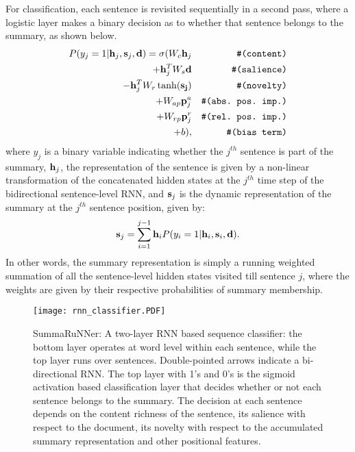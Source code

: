 \documentclass[letterpaper]{article}
\begin{document}
For classification, each sentence is revisited sequentially in a second pass, where a logistic layer makes a binary decision as to whether that sentence belongs to the summary, as shown below.
\begin{eqnarray}\label{eq:classification}
P(y_j=1|{\bf h}_j, {\bf s}_j, {\bf d}) = \sigma(W_{c}{\bf h}_j && \verb|#(content)| \nonumber\\
                                      + {\bf h}_j^TW_{s}{\bf d} && \verb|#(salience)| \nonumber\\
 - {\bf h}_j^TW_{r}\tanh({\bf s_j}) && \verb|#(novelty)| \nonumber\\ 
 + W_{ap}{\bf p}^a_j && \verb|#(abs. pos. imp.)| \nonumber\\
 + W_{rp}{\bf p}^r_j  && \verb|#(rel. pos. imp.)| \nonumber\\
 + b),&& \verb|#(bias term)| 
\end{eqnarray}
where $y_j$ is a binary variable indicating whether the $j^{th}$ sentence is part of the summary, ${\bf h}_j$, the representation of the sentence is given by a non-linear transformation of the concatenated hidden states at the $j^{th}$ time step of the bidirectional sentence-level RNN, and ${\bf s}_j$ is the dynamic representation of the summary at the $j^{th}$ sentence position, given by:
\begin{equation}\label{eq:summary_rep}
{\bf s}_j = \sum_{i=1}^{j-1}{\bf h}_iP(y_i=1|{\bf h}_i, {\bf s}_i, {\bf d}).
\end{equation}
In other words, the summary representation is simply a running weighted summation of all the sentence-level hidden states visited till sentence $j$, where the weights are given by their respective probabilities of summary membership.


\begin{figure}[ht]
    \vspace{-0.3in}
	\centering
  \texttt{[image: rnn\_classifier.PDF]}
  	\vspace{-0.5in}
	\caption{{\small SummaRuNNer: A two-layer RNN based sequence classifier: the bottom layer operates at word level within each sentence, while the top layer runs over sentences. Double-pointed arrows indicate a bi-directional RNN. The top layer with 1's and 0's is the sigmoid activation based classification layer that decides whether or not each sentence belongs to the summary. The decision at each sentence depends on the content richness of the sentence, its salience with respect to the document, its novelty with respect to the accumulated summary representation and other positional features.}}
	\label{fig:rnn_classifier}
\end{figure}
\end{document}

